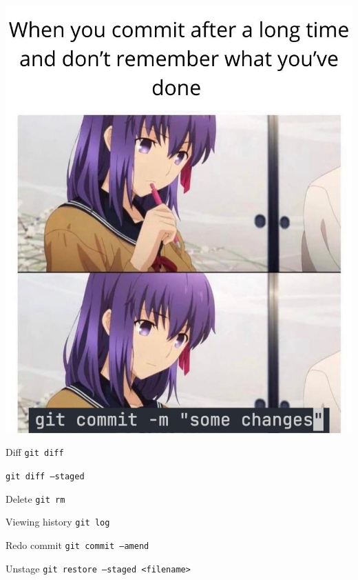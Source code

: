 \documentclass[17pt]{beamer}
\begin{document}
\begin{frame}
  \centering
  \includegraphics[height=\textheight]{commit-meme}
\end{frame}

\begin{frame}{Diff}
  \texttt{git diff}

  \texttt{git diff --staged}
\end{frame}

\begin{frame}{Delete}
  \texttt{git rm}
\end{frame}

\begin{frame}{Viewing history}
  \texttt{git log}
\end{frame}

\begin{frame}{Redo commit}
  \texttt{git commit --amend}
\end{frame}

\begin{frame}{Unstage}
  \texttt{git restore --staged <filename>}
\end{frame}
\end{document}
